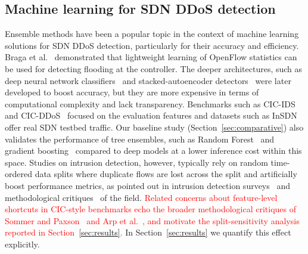 \documentclass{ieeeaccess}
\begin{document}
\subsection{Machine learning for SDN DDoS detection}
Ensemble methods have been a popular topic in the context of machine learning solutions for SDN DDoS detection, particularly for their accuracy and efficiency. Braga et al.~\cite{braga2010lightweight} demonstrated that lightweight learning of OpenFlow statistics can be used for detecting flooding at the controller. The deeper architectures, such as deep neural network classifiers~\cite{tang2016deep} and stacked-autoencoder detectors~\cite{niyaz2017deep} were later developed to boost accuracy, but they are more expensive in terms of computational complexity and lack transparency. Benchmarks such as CIC-IDS~\cite{sharafaldin2018cicids} and CIC-DDoS~\cite{sharafaldin2019ddos} focused on the evaluation features and datasets such as InSDN~\cite{elsayed2020insdn} offer real SDN testbed traffic. Our baseline study (Section~\ref{sec:comparative}) also validates the performance of tree ensembles, such as Random Forest~\cite{breiman2001rf} and gradient boosting~\cite{chen2016xgboost} compared to deep models at a lower inference cost within this space. Studies on intrusion detection, however, typically rely on random time-ordered data splits where duplicate flows are lost across the split and artificially boost performance metrics, as pointed out in intrusion detection surveys~\cite{ring2019survey} and methodological critiques~\cite{sommer2010outside,arp2022dos} of the field. \textcolor{red}{Related concerns about feature-level shortcuts in CIC-style benchmarks echo the broader methodological critiques of Sommer and Paxson~\cite{sommer2010outside} and Arp et al.~\cite{arp2022dos}, and motivate the split-sensitivity analysis reported in Section~\ref{sec:results}.} In Section~\ref{sec:results} we quantify this effect explicitly.
\end{document}
